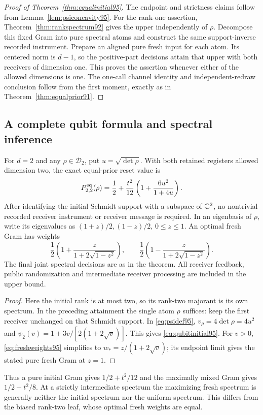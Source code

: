 \begin{proof}[Proof of Theorem~\ref{thm:equalinitial95}]
The endpoint and strictness claims follow from
Lemma~\ref{lem:psiconcavity95}.  For the rank-one assertion,
Theorem~\ref{thm:rankspectrum92} gives the upper independently of
$\rho$.  Decompose this fixed Gram into pure spectral atoms and
construct the same support-inverse recorded instrument.  Prepare an
aligned pure fresh input for each atom.  Its centered norm is $d-1$,
so the positive-part decisions attain that upper with both receivers
of dimension one.  This proves the assertion whenever either of the
allowed dimensions is one.  The one-call channel identity and
independent-redraw conclusion follow from the first moment, exactly as
in Theorem~\ref{thm:equalprior91}.
\end{proof}

\subsection{A complete qubit formula and spectral inference}
\begin{corollary}
\label{cor:qubitinitial95}
For $d=2$ and any $\rho\in\mathcal D_2$, put
$u=\sqrt{\det\rho}$.  With both retained registers allowed dimension
two, the exact equal-prior reset value is
\begin{equation}\label{eq:qubitinitial95}
 P_{2,2}^{\rm eq}(\rho)
  =\frac12+\frac{t^2}{12}
                     \left(1+\frac{6u^2}{1+4u}\right).
\end{equation}
After identifying the initial Schmidt support with a subspace of $\mathbb C^2$,
no nontrivial recorded receiver instrument or receiver message is required.
In an eigenbasis of $\rho$, write its eigenvalues as
$(1+z)/2,(1-z)/2$, $0\le z\le1$.  An optimal fresh Gram has weights
\begin{equation}\label{eq:qubitfresh95}
 \frac12\left(1+\frac{z}{1+2\sqrt{1-z^2}}\right),\qquad
 \frac12\left(1-\frac{z}{1+2\sqrt{1-z^2}}\right).
\end{equation}
The final joint spectral decisions are as in the theorem.
All receiver feedback, public randomization and intermediate receiver
processing are included in the upper bound.
\end{corollary}
\begin{proof}
Here the initial rank is at most two, so its rank-two majorant is its
own spectrum.  In the preceding attainment the single atom $\rho$
suffices: keep the first receiver unchanged on that Schmidt support.  In
\eqref{eq:psidef95}, $v_\rho=4\det\rho=4u^2$ and
$\psi_2(v)=1+3v/[2(1+2\sqrt v)]$.
This gives \eqref{eq:qubitinitial95}.
For $v>0$, \eqref{eq:freshweights95} simplifies to
$w_*=z/(1+2\sqrt v)$; its endpoint limit gives the stated pure
fresh Gram at $z=1$.
\end{proof}
Thus a pure initial Gram gives $1/2+t^2/12$ and the maximally mixed
Gram gives $1/2+t^2/8$.  At a strictly intermediate spectrum the
maximizing fresh spectrum is generally neither the initial spectrum
nor the uniform spectrum.  This differs from the biased rank-two
leaf, whose optimal fresh weights are equal.

